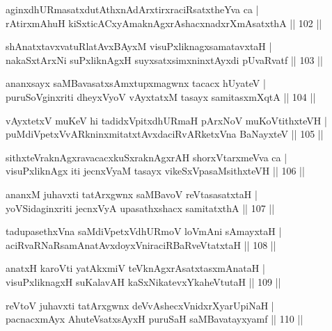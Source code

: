 \begin{shl}
aginxdhURmasatxdutAthxnAdArxtirxraciRsatxtheYva ca | \\
rAtirxmAhuH kiSxticACxyAmaknAgxrAshacxnadxrXmAsatxthA \hfill|| 102 || 
\end{shl}

\begin{shl}
shAnatxtavxvatuRlatAvxBAyxM visuPxliknagxsamatavxtaH | \\
nakaSxtArxNi suPxliknAgxH suyxsatxsimxninxtAyxdi pUvaRvatf \hfill|| 103 || 
\end{shl}

\begin{shl}
ananxsayx saMBavasatxsAmxtupxmagwnx tacacx hUyateV | \\
puruSoV\s ginxriti dheyxVyoV vAyxtatxM tasayx samitasxmXqtA \hfill|| 104 || 
\end{shl}

\begin{shl}
vAyxtetxV muKeV hi tadidxVpitxdhURmaH pArxNoV muKoVtithxteVH | \\
puMdiVpetxVvARkninxmitatxtAvxdaciRvARketxVna BaNayxteV \hfill|| 105 || 
\end{shl}

\begin{shl}
sithxteVraknAgxravacacxkuSxraknAgxrAH shorxVtarxmeVva ca | \\
visuPxliknAgx iti jecnxVyaM tasayx vikeSxVpasaMsithxteVH \hfill|| 106 || 
\end{shl}

\begin{shl}
ananxM juhavxti tatArxgwnx saMBavoV reVtasasatxtaH | \\
yoVSidaginxriti jecnxVyA upasathxshacx samitatxthA \hfill|| 107 || 
\end{shl}

\begin{shl}
tadupasethxVna saMdiVpetxVdhURmoV loVmAni sAmayxtaH | \\
aciRvaRNaRsamAnatAvxdoyxVniraciRBaRveVtatxtaH \hfill|| 108 || 
\end{shl}

\begin{shl}
anatxH karoVti yatAkxmiV teV\s knAgxrAsatxtasxmAnataH | \\
visuPxliknagxH suKalavAH kaSxNikatevxYkaheVtutaH \hfill|| 109 || 
\end{shl}

\begin{shl}
reVtoV juhavxti tatArxgwnx deVvAshecxVnidxrXyarUpiNaH | \\
pacnacxmAyx AhuteVsatxsAyxH puruSaH saMBavatayxyamf \hfill|| 110 || 
\end{shl}

